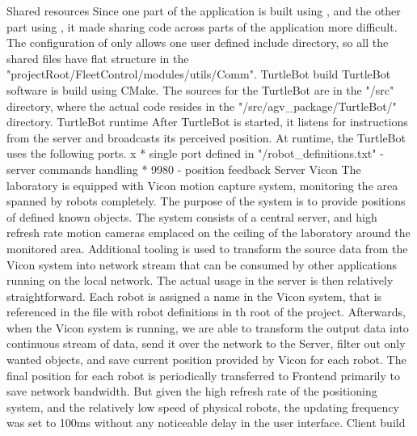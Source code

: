 \sec Shared resources
Since one part of the application is built using \makefile, and the other part using \cmake, it made sharing code across parts of the application more difficult. The configuration of \of only allows one user defined include directory, so all the shared files have flat structure in the "{projectRoot}/FleetControl/modules/utils/Comm".
\sec TurtleBot build
TurtleBot software is build using CMake.
The sources for the TurtleBot are in the "/src" directory, where the actual code resides in the "/src/agv_package/TurtleBot/" directory.
\sec TurtleBot runtime
After TurtleBot is started, it listens for instructions from the server and broadcasts its perceived position.
At runtime, the TurtleBot uses the following ports.
\begitems \style x
    * single port defined in "/robot_definitions.txt" - server commands handling
    * 9980 - position feedback
\enditems
\sec Server
\secc Vicon
The laboratory is equipped with Vicon motion capture system, monitoring the area spanned by robots completely. The purpose of the system is to provide positions of defined known objects.\br
The system consists of a central server, and high refresh rate motion cameras emplaced on the ceiling of the laboratory around the monitored area. Additional tooling is used to transform the source data from the Vicon system into network stream that can be consumed by other applications running on the local network.\br
The actual usage in the server is then relatively straightforward. Each robot is assigned a name in the Vicon system, that is referenced in the file with robot definitions in th root of the project. Afterwards, when the Vicon system is running, we are able to transform the output data into continuous stream of data, send it over the network to the Server, filter out only wanted objects, and save current position provided by Vicon for each robot. The final position for each robot is periodically transferred to Frontend primarily to save network bandwidth. But given the high refresh rate of the positioning system, and the relatively low speed of physical robots, the updating frequency was set to 100ms without any noticeable delay in the user interface.
\sec Client build

